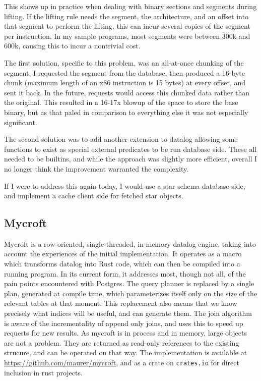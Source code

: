 This shows up in practice when dealing with binary sections and segments during lifting.
If the lifting rule needs the segment, the architecture, and an offset into that segment to perform the lifting, this can incur several copies of the segment per instruction.
In my sample programs, most segments were between 300k and 600k, causing this to incur a nontrivial cost.

The first solution, specific to this problem, was an all-at-once chunking of the segment.
I requested the segment from the database, then produced a 16-byte chunk (maximum length of an x86 instruction is 15 bytes) at every offset, and sent it back.
In the future, requests would access this chunked data rather than the original.
This resulted in a 16-17x blowup of the space to store the base binary, but as that paled in comparison to everything else it was not especially significant.

The second solution was to add another extension to datalog allowing some functions to exist as special external predicates to be run database side.
These all needed to be builtins, and while the approach was slightly more efficient, overall I no longer think the improvement warranted the complexity.

If I were to address this again today, I would use a star schema database side, and implement a cache client side for fetched star objects.

\subsection{Mycroft}
\label{sec:mycroft}
Mycroft is a row-oriented, single-threaded, in-memory datalog engine, taking into account the experiences of the initial implementation.
It operates as a macro which transforms datalog into Rust code, which can then be compiled into a running program.
In its current form, it addresses most, though not all, of the pain points encountered with Postgres.
The query planner is replaced by a single plan, generated at compile time, which parameterizes itself only on the size of the relevant tables at that moment.
This replacement also means that we know precisely what indices will be useful, and can generate them.
The join algorithm is aware of the incrementality of append only joins, and uses this to speed up requests for new results. 
As mycroft is in process and in memory, large objects are not a problem.
They are returned as read-only references to the existing strucure, and can be operated on that way.
The implementation is available at \url{https://github.com/maurer/mycroft}, and as a crate on \texttt{crates.io} for direct inclusion in rust projects.

